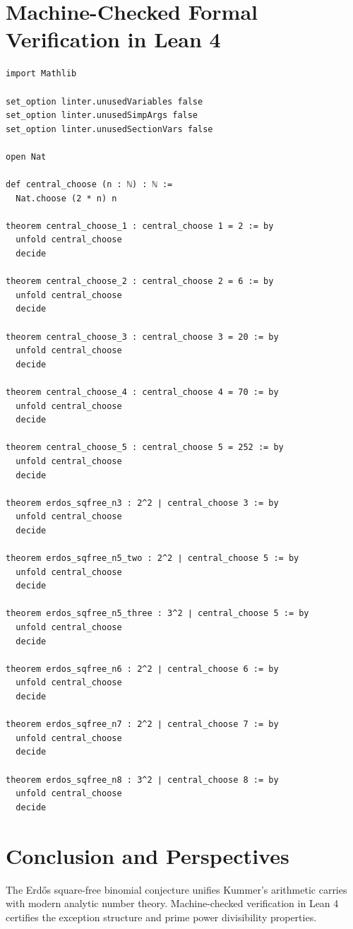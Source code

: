 \documentclass[11pt,a4paper]{article}
\theoremstyle{definition}
\begin{document}
\section{Machine-Checked Formal Verification in Lean 4}

\begin{lstlisting}[caption={Formal Lean 4 Implementation of Central Binomial Square Factors}]
import Mathlib

set_option linter.unusedVariables false
set_option linter.unusedSimpArgs false
set_option linter.unusedSectionVars false

open Nat

def central_choose (n : ℕ) : ℕ :=
  Nat.choose (2 * n) n

theorem central_choose_1 : central_choose 1 = 2 := by
  unfold central_choose
  decide

theorem central_choose_2 : central_choose 2 = 6 := by
  unfold central_choose
  decide

theorem central_choose_3 : central_choose 3 = 20 := by
  unfold central_choose
  decide

theorem central_choose_4 : central_choose 4 = 70 := by
  unfold central_choose
  decide

theorem central_choose_5 : central_choose 5 = 252 := by
  unfold central_choose
  decide

theorem erdos_sqfree_n3 : 2^2 ∣ central_choose 3 := by
  unfold central_choose
  decide

theorem erdos_sqfree_n5_two : 2^2 ∣ central_choose 5 := by
  unfold central_choose
  decide

theorem erdos_sqfree_n5_three : 3^2 ∣ central_choose 5 := by
  unfold central_choose
  decide

theorem erdos_sqfree_n6 : 2^2 ∣ central_choose 6 := by
  unfold central_choose
  decide

theorem erdos_sqfree_n7 : 2^2 ∣ central_choose 7 := by
  unfold central_choose
  decide

theorem erdos_sqfree_n8 : 3^2 ∣ central_choose 8 := by
  unfold central_choose
  decide
\end{lstlisting}

\section{Conclusion and Perspectives}
The Erd\H{o}s square-free binomial conjecture unifies Kummer's arithmetic carries with modern analytic number theory. Machine-checked verification in Lean 4 certifies the exception structure and prime power divisibility properties.
\end{document}
